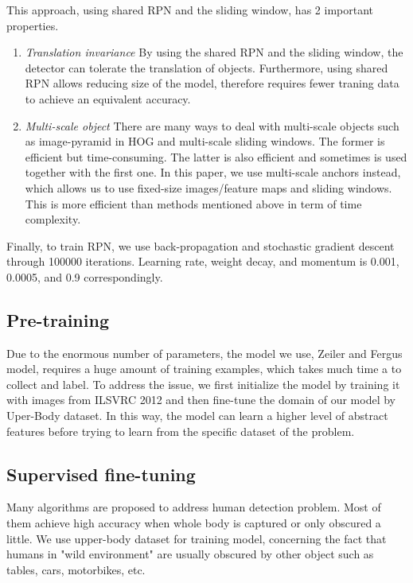 \documentclass[conference]{IEEEtran}
\begin{document}
This approach, using shared RPN and the sliding window, has 2 important properties.

\begin{enumerate}
	\item \emph{Translation invariance} By using the shared RPN and the sliding window, the detector can tolerate the translation of objects. Furthermore, using shared RPN allows reducing size of the model, therefore requires fewer traning data to achieve an equivalent accuracy.  
	\item \emph{Multi-scale object} There are many ways to deal with multi-scale objects such as image-pyramid in HOG and multi-scale sliding windows. The former is efficient but time-consuming. The latter is also efficient and sometimes is used together with the first one. In this paper, we use multi-scale anchors instead, which allows us to use fixed-size images/feature maps and sliding windows. This is more efficient than methods mentioned above in term of time complexity.
\end{enumerate}

Finally, to train RPN, we use back-propagation and stochastic gradient descent through 100000 iterations. Learning rate, weight decay, and momentum is 0.001, 0.0005, and 0.9 correspondingly.
\subsection{Pre-training}
Due to the enormous number of parameters, the model we use, Zeiler and Fergus model, requires a huge amount of training examples, which takes much time a to collect and label. To address the issue, we first initialize the model by training it with images from ILSVRC 2012 and then fine-tune the domain of our model by Uper-Body dataset. In this way, the model can learn a higher level of abstract features before trying to learn from the specific dataset of the problem. %
\subsection{Supervised fine-tuning}
Many algorithms are proposed to address human detection problem. Most of them achieve high accuracy when whole body is captured or only obscured a little. We use upper-body dataset for training model, concerning the fact that humans in "wild environment" are usually obscured by other object such as tables, cars, motorbikes, etc. 
\end{document}
